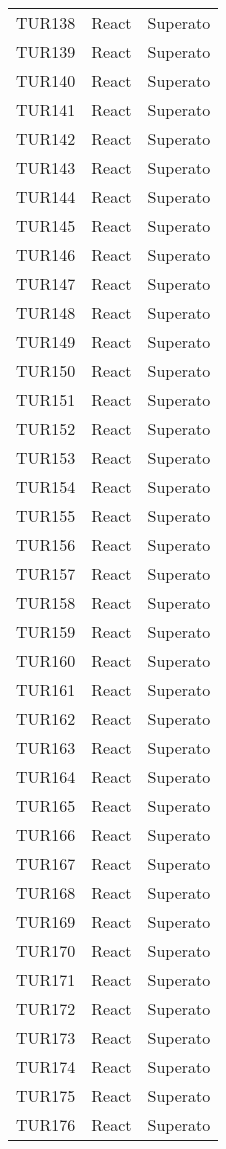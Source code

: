 \documentclass[PianoDiQualifica.tex]{subfiles}
\begin{document}
\begin{longtable}[H]{P{2cm}P{8.5cm}P{3cm}}
	TUR138 & React & Superato \\ 
	TUR139 & React & Superato \\ 
	TUR140 & React & Superato \\ 
	TUR141 & React & Superato \\ 
	TUR142 & React & Superato \\ 
	TUR143 & React & Superato \\ 
	TUR144 & React & Superato \\ 
	TUR145 & React & Superato \\ 
	TUR146 & React & Superato \\ 
	TUR147 & React & Superato \\ 
	TUR148 & React & Superato \\ 
	TUR149 & React & Superato \\ 
	TUR150 & React & Superato \\ 
	TUR151 & React & Superato \\ 
	TUR152 & React & Superato \\ 
	TUR153 & React & Superato \\ 
	TUR154 & React & Superato \\ 
	TUR155 & React & Superato \\ 
	TUR156 & React & Superato \\ 
	TUR157 & React & Superato \\ 
	TUR158 & React & Superato \\ 
	TUR159 & React & Superato \\ 
	TUR160 & React & Superato \\ 
	TUR161 & React & Superato \\ 
	TUR162 & React & Superato \\ 
	TUR163 & React & Superato \\ 
	TUR164 & React & Superato \\ 
	TUR165 & React & Superato \\ 
	TUR166 & React & Superato \\ 
	TUR167 & React & Superato \\ 
	TUR168 & React & Superato \\ 
	TUR169 & React & Superato \\ 
	TUR170 & React & Superato \\ 
	TUR171 & React & Superato \\ 
	TUR172 & React & Superato \\ 
	TUR173 & React & Superato \\ 
	TUR174 & React & Superato \\ 
	TUR175 & React & Superato \\ 
	TUR176 & React & Superato \\


\end{longtable}
\end{document}
